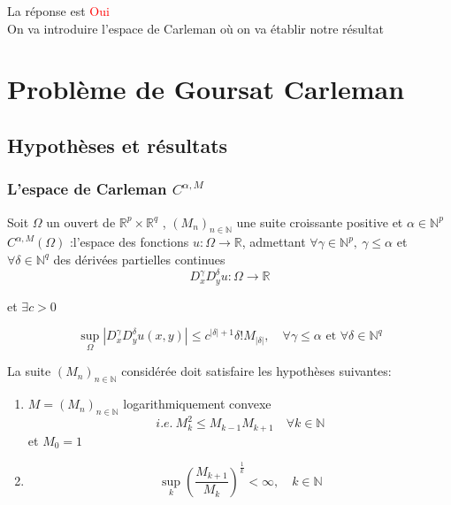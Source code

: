 \documentclass{beamer}
\newcommand{\N}{\ensuremath{\mathbb{N}}}
\newcommand{\Np}{\ensuremath{\mathbb{N}^p}}
\newcommand{\Nq}{\ensuremath{\mathbb{N}^q}}
\newcommand{\M}{\ensuremath{\mathbb{R}}}
\newcommand{\Mpq}{\ensuremath{\mathbb{R}^p\times \mathbb{R}^q}}
\begin{document}
\begin{frame}
La réponse est \textcolor{red}{Oui}\\
 \bigskip
On va introduire l'espace de Carleman où on va établir notre résultat 
\end{frame}
\section{Problème de Goursat Carleman}

\subsection{Hypothèses et résultats}


\begin{frame}
\frametitle{L'espace de Carleman $C^{\alpha,M}$ }
Soit $ \Omega $ un ouvert de $ \Mpq $ , $ (M_n)_{n \in \N} $  une suite croissante positive et $\alpha \in \Np $\\

$ C^{\alpha,M}(\Omega)$ :l'espace des fonctions $u:\Omega \rightarrow \M $, admettant $\forall \gamma \in \Np,\  \gamma \leq \alpha$ et $\forall \delta \in \Nq$ des dérivées partielles continues $$ D^\gamma_xD^\delta_yu:\Omega \rightarrow \M$$

et $\exists c >0$
 
 $$ \sup_\Omega |D^\gamma_xD^\delta_yu(x,y)| \leq c^{|\delta|+1} \delta ! M_{|\delta|}, \quad  \forall \gamma \leq \alpha \text{ et } \forall \delta \in \Nq $$
\end{frame}

\begin{frame}
La suite $(M_n)_{n \in \N}$ considérée doit satisfaire les hypothèses suivantes:
\begin{enumerate}
\item 
$ M=(M_n)_{n \in \N} $ logarithmiquement convexe
\begin{equation*}
i.e.\ M_k^2 \leq M_{k-1} M_{k+1} \quad \forall k \in \N
\end{equation*}
et $M_0=1$
\item 
\begin{equation*}
\sup_k (  \frac{M_{k+1}}{M_k})^\frac{1}{k} < \infty, \quad k \in \N
\end{equation*}
\end{enumerate}

\end{frame}
\end{document}
